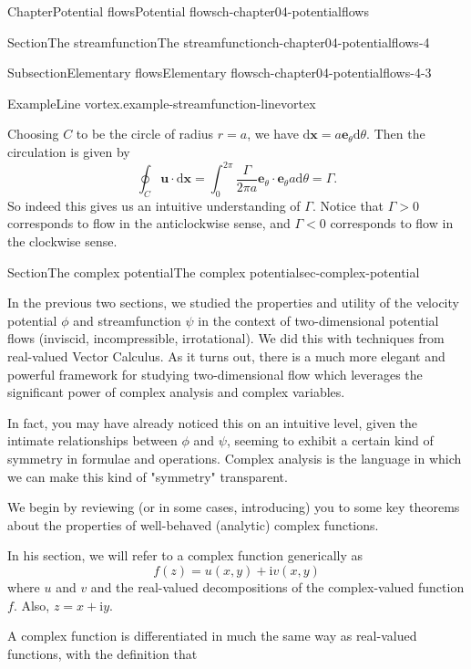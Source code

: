 \documentclass[oneside,10pt,]{book}
\numberwithin{equation}{section}
\newcommand{\im}{\mathrm{i}}
\newcommand{\de}{\mathrm{d}}
\newcommand{\bx}{\boldsymbol{x}}
\newcommand{\be}{\boldsymbol{e}}
\newcommand{\bu}{\boldsymbol{u}}
\newcommand{\lt}{<}
\newcommand{\gt}{>}
\begin{document}
\begin{chapterptx}{Chapter}{Potential flows}{}{Potential flows}{}{}{ch-chapter04-potentialflows}
\begin{sectionptx}{Section}{The streamfunction}{}{The streamfunction}{}{}{ch-chapter04-potentialflows-4}
\begin{subsectionptx}{Subsection}{Elementary flows}{}{Elementary flows}{}{}{ch-chapter04-potentialflows-4-3}
\begin{example}{Example}{Line vortex.}{example-streamfunction-linevortex}
\par
Choosing \(C\) to be the circle of radius \(r = a\), we have \(\de{\bx} = a \be_{\theta} \de{\theta}\). Then the circulation is given by%
\begin{equation*}
\oint_C \bu \cdot \de{\bx} = \int_0^{2\pi} \frac{\Gamma}{2\pi a} \be_{\theta} \cdot \be_{\theta} a \de\theta = \Gamma.
\end{equation*}
So indeed this gives us an intuitive understanding of \(\Gamma\). Notice that \(\Gamma \gt 0\) corresponds to flow in the anticlockwise sense, and \(\Gamma \lt 0\) corresponds to flow in the clockwise sense.%
\end{example}
\end{subsectionptx}
\end{sectionptx}
%
%
\typeout{************************************************}
\typeout{************************************************}
%
\begin{sectionptx}{Section}{The complex potential}{}{The complex potential}{}{}{sec-complex-potential}
\begin{introduction}{}%
In the previous two sections, we studied the properties and utility of the velocity potential \(\phi\) and streamfunction \(\psi\) in the context of two-dimensional potential flows (inviscid, incompressible, irrotational). We did this with techniques from real-valued Vector Calculus.  As it turns out, there is a much more elegant and powerful framework for studying two-dimensional flow which leverages the significant power of complex analysis and complex variables.%
\par
In fact, you may have already noticed this on an intuitive level, given the intimate relationships between \(\phi\) and \(\psi\), seeming to exhibit a certain kind of symmetry in formulae and operations. Complex analysis is the language in which we can make this kind of "symmetry" transparent.%
\par
We begin by reviewing (or in some cases, introducing) you to some key theorems about the properties of well-behaved (analytic) complex functions.%
\par
In his section, we will refer to a complex function generically as%
\begin{equation*}
f(z) = u(x, y) + \im v(x, y)
\end{equation*}
where \(u\) and \(v\) and the real-valued decompositions of the complex-valued function \(f\). Also, \(z = x + \im y\).%
\par
A complex function is differentiated in much the same way as real-valued functions, with the definition that%

\end{introduction}
\end{sectionptx}
\end{chapterptx}
\end{document}
